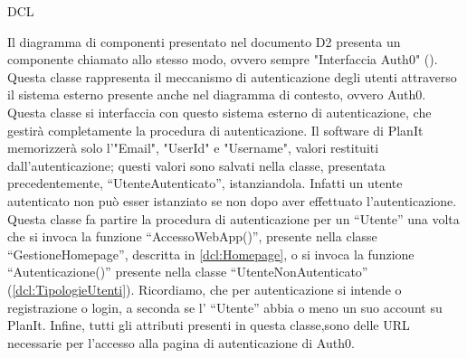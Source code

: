 \begin{listaPersonale}{DCL}
    \begin{center}
        
    \end{center}
    \newpage


    Il diagramma di componenti presentato nel documento D2 presenta un componente chiamato allo stesso modo, ovvero sempre "Interfaccia Auth0" (). Questa classe rappresenta il meccanismo di autenticazione degli utenti attraverso il sistema esterno presente anche nel diagramma di contesto, ovvero Auth0. Questa classe si interfaccia con questo sistema esterno di autenticazione, che gestirà completamente la procedura di autenticazione. Il software di PlanIt memorizzerà solo l'"Email", "UserId" e "Username", valori restituiti dall'autenticazione; questi valori sono salvati nella classe, presentata precedentemente, “UtenteAutenticato”, istanziandola. Infatti un utente autenticato non può esser istanziato se non dopo aver effettuato l'autenticazione. \\
    Questa classe fa partire la procedura di autenticazione per un “Utente” una volta che si invoca la funzione “AccessoWebApp()”, presente nella classe “GestioneHomepage”, descritta in \ref{dcl:Homepage}, o si invoca la funzione “Autenticazione()” presente nella classe “UtenteNonAutenticato” (\ref{dcl:TipologieUtenti}). Ricordiamo, che per autenticazione si intende o registrazione o login, a seconda se l' “Utente” abbia o meno un suo account su PlanIt. Infine, tutti gli attributi presenti in questa classe,sono delle URL necessarie per l'accesso alla pagina di autenticazione di Auth0.


    \begin{center}
        
    \end{center}
    \newpage




\end{listaPersonale}
